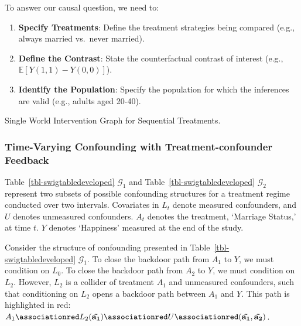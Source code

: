 \documentclass[
  single column]{article}
\providecommand{\tightlist}{%
  \setlength{\itemsep}{0pt}\setlength{\parskip}{0pt}}\usepackage{longtable,booktabs,array}
\begin{document}
To answer our causal question, we need to:

\begin{enumerate}
\def\labelenumi{\arabic{enumi}.}
\tightlist
\item
  \textbf{Specify Treatments}: Define the treatment strategies being
  compared (e.g., always married vs.~never married).
\item
  \textbf{Define the Contrast}: State the counterfactual contrast of
  interest (e.g., \(\mathbb{E}[Y(1,1) - Y(0,0)]\)).
\item
  \textbf{Identify the Population}: Specify the population for which the
  inferences are valid (e.g., adults aged 20-40).
\end{enumerate}

\begin{table}

\caption{\label{tbl-swigtabledeveloped}Single World Intervention Graph
for Sequential Treatments.}

\centering{

\swigtabledeveloped

}

\end{table}%

\subsubsection{Time-Varying Confounding with Treatment-confounder
Feedback}\label{time-varying-confounding-with-treatment-confounder-feedback}

Table~\ref{tbl-swigtabledeveloped} \(\mathcal{G}_1\) and
Table~\ref{tbl-swigtabledeveloped} \(\mathcal{G}_2\) represent two
subsets of possible confounding structures for a treatment regime
conducted over two intervals. Covariates in \(L_t\) denote measured
confounders, and \(U\) denotes unmeasured confounders. \(A_t\) denotes
the treatment, `Marriage Status,' at time \(t\). \(Y\) denotes
`Happiness' measured at the end of the study.

Consider the structure of confounding presented in
Table~\ref{tbl-swigtabledeveloped} \(\mathcal{G}_1\). To close the
backdoor path from \(A_1\) to \(Y\), we must condition on \(L_0\). To
close the backdoor path from \(A_2\) to \(Y\), we must condition on
\(L_2\). However, \(L_2\) is a collider of treatment \(A_1\) and
unmeasured confounders, such that conditioning on \(L_2\) opens a
backdoor path between \(A_1\) and \(Y\). This path is highlighted in
red:
\(A_1 \associationred L_2({\mathbf{\tilde{a_1}}}) \associationred U \associationred ({\mathbf{\tilde{a_1}, \tilde{a_2}}})\).
\end{document}
